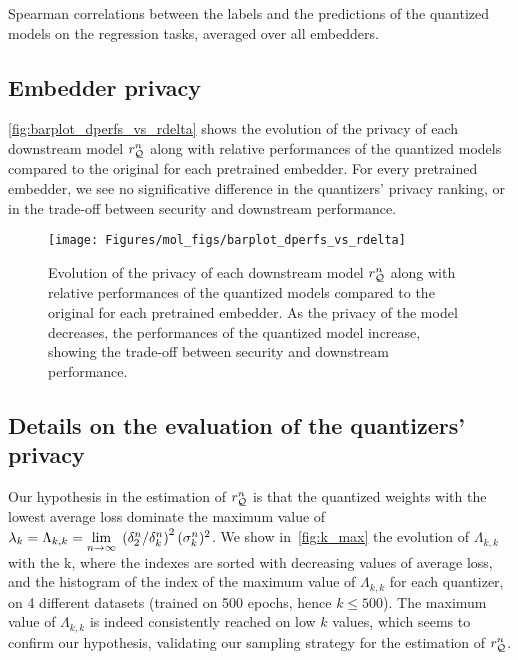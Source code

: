 \begin{table*}
    \caption{
        Spearman correlations between the labels and the predictions of the quantized models on the regression tasks, averaged over all embedders.
    }
    \label{tab:mol_reg_sp}
\resizebox{\textwidth}{!}{
        
    }
\end{table*}

\subsection{Embedder privacy}

\autoref{fig:barplot_dperfs_vs_rdelta} shows the evolution of the privacy of each downstream model $r_{{\mathcal{Q}}}^n$ along with relative performances of the quantized models compared to the original for each pretrained embedder.
For every pretrained embedder, we see no significative difference in the quantizers' privacy ranking, or in the trade-off between security and downstream performance.


\begin{figure*}
    \centering
    \texttt{[image: Figures/mol\_figs/barplot\_dperfs\_vs\_rdelta]}
    \caption{
        Evolution of the privacy of each downstream model $r_{{\mathcal{Q}}}^n$ along with relative performances of the quantized models compared to the original for each pretrained embedder.
        As the privacy of the model decreases, the performances of the quantized model increase, showing the trade-off between security and downstream performance.
    }
    \label{fig:barplot_dperfs_vs_rdelta}
\end{figure*}






\subsection{Details on the evaluation of the quantizers' privacy}
\label{subsec:eval_privacy}

Our hypothesis in the estimation of $r_{{\mathcal{Q}}}^n$  is that the quantized weights with the lowest average loss dominate the maximum value of $\lambda_k = \Lambda_{k,k} = \underset{n\to\infty}{\lim}\;\left(\delta_{2}^n/\delta_{k}^n\right)^2(\sigma_k^n)^2$.
We show in~\autoref{fig:k_max} the evolution of $\Lambda_{k,k}$ with the k, where the indexes are sorted with decreasing values of average loss, and the histogram of the index of the maximum value of $\Lambda_{k,k}$ for each quantizer, on 4 different datasets (trained on 500 epochs, hence $k \leq 500$).
The maximum value of $\Lambda_{k,k}$ is indeed consistently reached on low $k$ values, which seems to confirm our hypothesis, validating our sampling strategy for the estimation of $r_{{\mathcal{Q}}}^n$.


